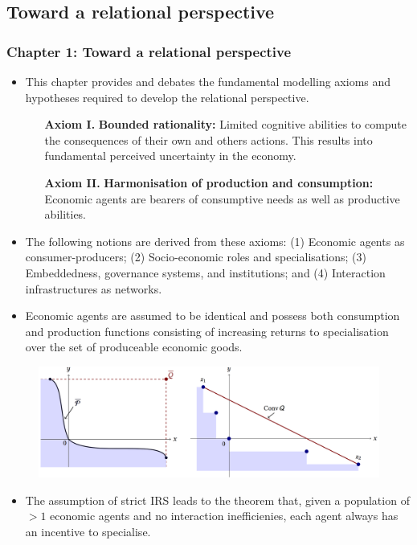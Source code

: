 \documentclass[10pt]{beamer}
\begin{document}
\subsection{Toward a relational perspective}

\begin{frame} \frametitle{Chapter 1: Toward a relational perspective}
\begin{itemize}
\item This chapter provides and debates the fundamental modelling axioms and hypotheses required to develop the relational perspective.
\begin{itemize}
\medskip
\item[\textbf{Axiom I.}] \textbf{Bounded rationality:} Limited cognitive abilities to compute the consequences of their own and others actions. This results into fundamental perceived uncertainty in the economy.
\medskip
\item[\textbf{Axiom II.}] \textbf{Harmonisation of production and consumption:} Economic agents are bearers of consumptive needs as well as productive abilities.
\end{itemize}
\medskip
\item The following notions are derived from these axioms: (1) Economic agents as consumer-producers; (2) Socio-economic roles and specialisations; (3) Embeddedness, governance systems, and institutions; and (4) Interaction infrastructures as networks.
\end{itemize}
\end{frame}


\begin{frame}
\begin{itemize}
\item Economic agents are assumed to be identical and possess both consumption and production functions consisting of increasing returns to specialisation over the set of produceable economic goods.
\end{itemize}
\begin{figure}[h]
\centering
\includegraphics[scale=0.135]{../Images/IRS.png}
\end{figure}
\begin{itemize}
\item The assumption of strict IRS leads to the theorem that, given a population of $> 1$ economic agents and no interaction inefficienies, each agent always has an incentive to specialise.
\end{itemize}
\end{frame}
\end{document}

